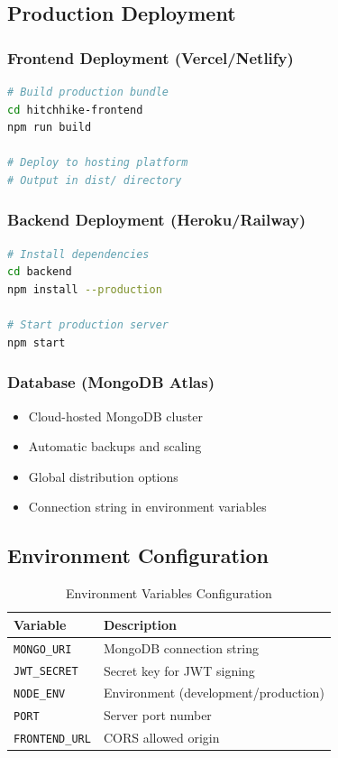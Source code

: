 \documentclass[12pt,a4paper]{article}
\begin{document}
\subsection{Production Deployment}

\subsubsection{Frontend Deployment (Vercel/Netlify)}
\begin{lstlisting}[language=bash]
# Build production bundle
cd hitchhike-frontend
npm run build

# Deploy to hosting platform
# Output in dist/ directory
\end{lstlisting}

\subsubsection{Backend Deployment (Heroku/Railway)}
\begin{lstlisting}[language=bash]
# Install dependencies
cd backend
npm install --production

# Start production server
npm start
\end{lstlisting}

\subsubsection{Database (MongoDB Atlas)}
\begin{itemize}
    \item Cloud-hosted MongoDB cluster
    \item Automatic backups and scaling
    \item Global distribution options
    \item Connection string in environment variables
\end{itemize}

\subsection{Environment Configuration}

\begin{table}[H]
\centering
\begin{tabular}{|l|p{8cm}|}
\hline
\textbf{Variable} & \textbf{Description} \\
\hline
\texttt{MONGO\_URI} & MongoDB connection string \\
\texttt{JWT\_SECRET} & Secret key for JWT signing \\
\texttt{NODE\_ENV} & Environment (development/production) \\
\texttt{PORT} & Server port number \\
\texttt{FRONTEND\_URL} & CORS allowed origin \\
\hline
\end{tabular}
\caption{Environment Variables Configuration}
\end{table}
\end{document}
